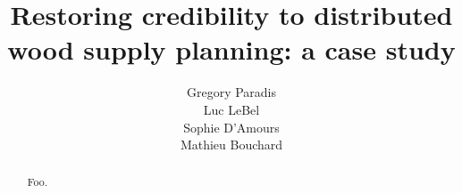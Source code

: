 \documentclass[letter]{article}
\title{Restoring credibility to distributed wood supply planning: a case study}
\author{
  Gregory Paradis\\
  Luc LeBel\\
  Sophie D'Amours\\
  Mathieu Bouchard
}
\begin{document}
\maketitle

\begin{abstract}
  Foo. 
\end{abstract}






\end{document}
